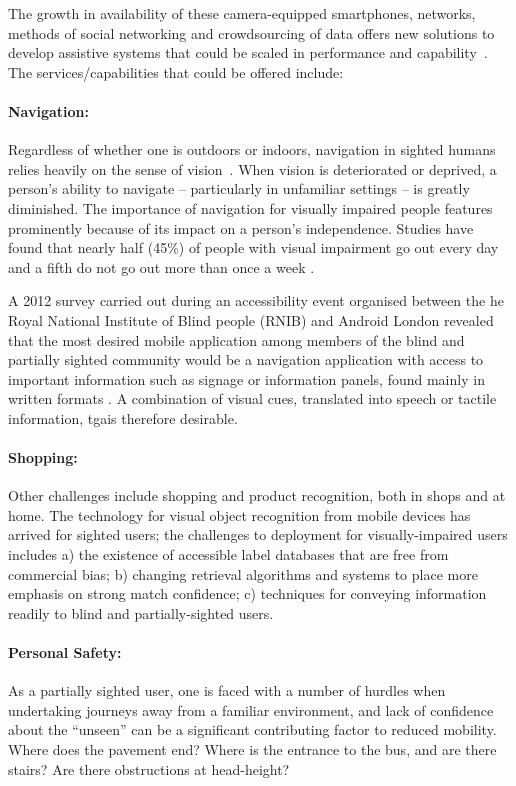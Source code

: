 The growth in availability of these camera-equipped smartphones, networks, methods of social networking and crowdsourcing of data offers new solutions to develop assistive systems that could be scaled in performance and capability~\cite{Manduchi2012,Worsfold2010}. The services/capabilities that could be offered include:

\paragraph{Navigation:} Regardless of whether one is outdoors or indoors, navigation in sighted humans relies heavily on the sense of vision~\citep{kalia2008learning,tsuji2005landmarks}. When vision is deteriorated or deprived, a person's ability to navigate -- particularly in unfamiliar settings -- is greatly diminished. The importance of navigation for visually impaired people features prominently because of its impact on a person's independence. Studies have found that nearly half (45\%) of people with visual impairment go out every day and a fifth do not go out more than once a week \citep{douglas2006network, RNIB2009}.

A 2012 survey carried out during an accessibility event organised between the he Royal National Institute of Blind people (RNIB) and Android London revealed that the most desired mobile application among members of the blind and partially sighted community would be a navigation application with access to important information such as signage or information panels, found mainly in written formats \citep{RNIB2012}. A combination of visual cues, translated into speech or tactile information, tgais therefore desirable.

\paragraph{Shopping:} Other challenges include shopping and product recognition, both in shops and at home. The technology for visual object recognition from mobile devices has arrived for sighted users; the challenges to deployment for visually-impaired users includes a) the existence of accessible label databases that are free from commercial bias; b) changing retrieval algorithms and systems to place more emphasis on strong match confidence; c) techniques for conveying information readily to blind and partially-sighted users.

\paragraph{Personal Safety:} As a partially sighted user, one is faced with a number of hurdles when undertaking journeys away from a familiar environment, and lack of confidence about the ``unseen'' can be a significant contributing factor to reduced mobility.  Where does the pavement end?  Where is the entrance to the bus, and are there stairs?  Are there obstructions at head-height?   

